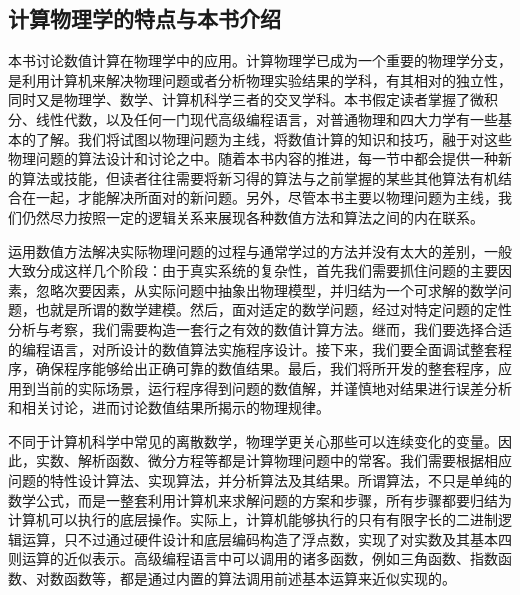 \subsection{计算物理学的特点与本书介绍}

本书讨论数值计算在物理学中的应用。计算物理学已成为一个重要的物理学分支，是利用计算机来解决物理问题或者分析物理实验结果的学科，有其相对的独立性，同时又是物理学、数学、计算机科学三者的交叉学科。本书假定读者掌握了微积分、线性代数，以及任何一门现代高级编程语言，对普通物理和四大力学有一些基本的了解。我们将试图以物理问题为主线，将数值计算的知识和技巧，融于对这些物理问题的算法设计和讨论之中。随着本书内容的推进，每一节中都会提供一种新的算法或技能，但读者往往需要将新习得的算法与之前掌握的某些其他算法有机结合在一起，才能解决所面对的新问题。另外，尽管本书主要以物理问题为主线，我们仍然尽力按照一定的逻辑关系来展现各种数值方法和算法之间的内在联系。

运用数值方法解决实际物理问题的过程与通常学过的方法并没有太大的差别，一般大致分成这样几个阶段：由于真实系统的复杂性，首先我们需要抓住问题的主要因素，忽略次要因素，从实际问题中抽象出物理模型，并归结为一个可求解的数学问题，也就是所谓的数学建模。然后，面对适定的数学问题，经过对特定问题的定性分析与考察，我们需要构造一套行之有效的数值计算方法。继而，我们要选择合适的编程语言，对所设计的数值算法实施程序设计。接下来，我们要全面调试整套程序，确保程序能够给出正确可靠的数值结果。最后，我们将所开发的整套程序，应用到当前的实际场景，运行程序得到问题的数值解，并谨慎地对结果进行误差分析和相关讨论，进而讨论数值结果所揭示的物理规律。

不同于计算机科学中常见的离散数学，物理学更关心那些可以连续变化的变量。因此，实数、解析函数、微分方程等都是计算物理问题中的常客。我们需要根据相应问题的特性设计算法、实现算法，并分析算法及其结果。所谓算法，不只是单纯的数学公式，而是一整套利用计算机来求解问题的方案和步骤，所有步骤都要归结为计算机可以执行的底层操作。实际上，计算机能够执行的只有有限字长的二进制逻辑运算，只不过通过硬件设计和底层编码构造了浮点数，实现了对实数及其基本四则运算的近似表示。高级编程语言中可以调用的诸多函数，例如三角函数、指数函数、对数函数等，都是通过内置的算法调用前述基本运算来近似实现的。

